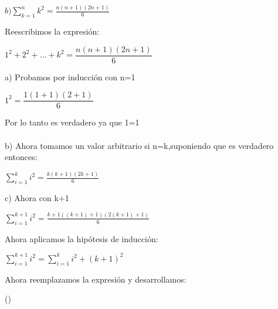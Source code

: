 \documentclass[12pt,a4paper,scrartcl]{article}
\begin{document}
{\newpage
\begin{flushleft}
$\displaystyle
b)  \sum_{k=1}^{n}k^{2} = \frac{n(n+1)(2n+1)}{6}$
\end{flushleft}
Reescribimos la expresi\'on:
\begin{center}
$1^2+2^2+\ldots+k^2=\dfrac{n(n+1)(2n+1)}{6}$\\
\end{center}
a) Probamos por inducci\'on con n=1
\begin{center}
$1^2=\dfrac{1(1+1)(2+1)}{6}$\\
\end{center}
Por lo tanto es verdadero ya que 1=1\\\vspace{1em}
\\b) Ahora tomamos un valor arbitrario si n=k,suponiendo que es verdadero entonces:\\ 
\begin{center}
$\displaystyle
\sum_{i=1}^{k}i^{2} = \frac{k(k+1)(2k+1)}{6}$ \\
\end{center}
\begin{flushleft}
c) Ahora con k+1\\
\end{flushleft}
$\displaystyle
\sum_{i=1}^{k+1}i^{2} = \frac{k+1((k+1)+1)(2(k+1)+1)}{6}$ \\
\begin{flushleft}
Ahora aplicamos la hip\'otesis de inducci\'on:
\end{flushleft}
\begin{center}
$\displaystyle
\sum_{i=1}^{k+1}i^{2} = \sum_{i=1}^{k}i^{2} + (k+1)^2$ \\
\end{center}
\begin{flushleft}
Ahora reemplazamos la expresi\'on y desarrollamos:
\end{flushleft}

()


}
\end{document}

